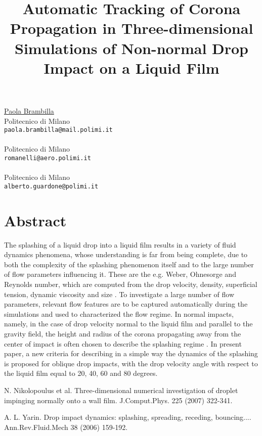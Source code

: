 \title{Automatic Tracking of Corona Propagation in Three-dimensional Simulations of Non-normal Drop Impact on a Liquid Film}
\author{}  \institute{}
\maketitle
\begin{center}
{\large \underline{Paola Brambilla}}\\
Politecnico di Milano\\
{\tt paola.brambilla@mail.polimi.it}
\\ \vspace{4mm}{\large Giulio Romanelli}\\
Politecnico di Milano\\
{\tt romanelli@aero.polimi.it}
\\ \vspace{4mm}{\large Alberto Guardone}\\
Politecnico di Milano\\
{\tt alberto.guardone@polimi.it}

\end{center}

\section*{Abstract}

The splashing of a liquid drop into a liquid film results in a variety of fluid dynamics phenomena, whose understanding is far from being complete, due to both the complexity of the splashing phenomenon itself and to the large number of flow parameters influencing it. These are the e.g. Weber, Ohnesorge and Reynolds number, which are computed from the drop velocity, density, superficial tension, dynamic viscosity and size \cite{YAR2006}.
To investigate a large number of flow parameters, relevant flow features are to be captured automatically during the simulations and used to characterized the flow regime.  In normal impacts, namely, in the case of drop velocity normal to the liquid film and parallel to the gravity field, the height and radius of the corona propagating away from the center of impact is often chosen to describe the splashing regime \cite{NIK2007}.
In present paper, a new criteria for describing in a simple way the dynamics of the splashing is proposed for oblique drop impacts, with the drop velocity angle with respect to the liquid film equal to 20, 40, 60 and 80 degrees.


\begin{thebibliography}{10}

{\sc N. Nikolopoulus et al}. {Three-dimensional numerical investigation of droplet impinging normally onto a wall film}. J.Comput.Phys. 225 (2007) 322-341.



{\sc A. L. Yarin}. {Drop impact dynamics: splashing, spreading, receding, bouncing...}. Ann.Rev.Fluid.Mech 38 (2006) 159-192.

\end{thebibliography}
